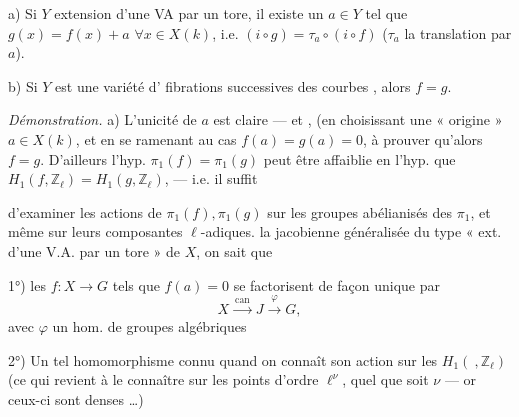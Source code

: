 \documentclass[11pt,a4paper]{article}
\begin{document}
a) Si $Y$    extension d'une VA par un tore, il existe un $a \in Y$  tel que $g(x) = f(x) + a$ $\forall x \in X(k)$, i.e. $(i \circ g) = \tau_a \circ (i \circ f)$ ($\tau_a$ la translation par $a$).


b) Si $Y$ est une variété  d' \ill{} \struck{\ill{}} fibrations successives des courbes ,  alors $f = g$.


\emph{Démonstration.} a) L'unicité de $a$ \struck{\ill{}} est claire — et   , (en choisissant  une « origine » $a \in X(k)$, et en se ramenant au cas $f(a) = g(a) = 0$, à prouver qu'alors $f = g$. D'ailleurs l'hyp. $\pi_1(f) = \pi_1(g)$ peut être affaiblie en l'hyp. que   $H_1(f, \mathbb{Z}_\ell) = H_1(g, \mathbb{Z}_\ell)$, — i.e. il suffit


d'examiner les actions de $\pi_1(f), \pi_1(g)$ sur les groupes abélianisés des $\pi_1$, et même sur leurs composantes $\ell$-adiques.  la jacobienne généralisée du type « ext. d'une V.A. par un tore »  de $X$, on sait que

1°) les  $f : X \to G$ tels que $f(a) = 0$ se factorisent de façon unique par
\[
X \xrightarrow{\ \mathrm{can}\ } J \xrightarrow{\ \varphi\ } G,
\]
avec $\varphi$ un hom. de groupes algébriques

2°)  Un tel homomorphisme  connu quand on connaît son action sur les $H_1(\ , \mathbb{Z}_\ell)$ (ce qui revient à le connaître sur les points d'ordre $\ell^\nu$, quel que soit $\nu$ — or ceux-ci sont denses …)
\end{document}
